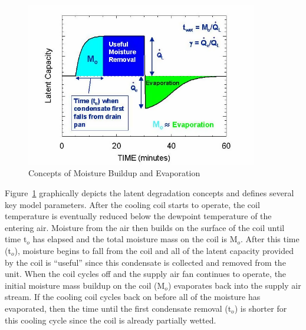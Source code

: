 \begin{figure}[hbtp] %
\centering
\includegraphics[width=0.9\textwidth, height=0.9\textheight, keepaspectratio=true]{media/image3486.png}
\caption{Concepts of Moisture Buildup and Evaporation \protect \label{fig:concepts-of-moisture-buildup-and-evaporation}}
\end{figure}

Figure~\ref{fig:concepts-of-moisture-buildup-and-evaporation} graphically depicts the latent degradation concepts and defines several key model parameters. After the cooling coil starts to operate, the coil temperature is eventually reduced below the dewpoint temperature of the entering air. Moisture from the air then builds on the surface of the coil until time t\(_{o}\) has elapsed and the total moisture mass on the coil is M\(_{o}\). After this time (t\(_{o}\)), moisture begins to fall from the coil and all of the latent capacity provided by the coil is ``useful'' since this condensate is collected and removed from the unit. When the coil cycles off and the supply air fan continues to operate, the initial moisture mass buildup on the coil (M\(_{o}\)) evaporates back into the supply air stream. If the cooling coil cycles back on before all of the moisture has evaporated, then the time until the first condensate removal (t\(_{o}\)) is shorter for this cooling cycle since the coil is already partially wetted.

